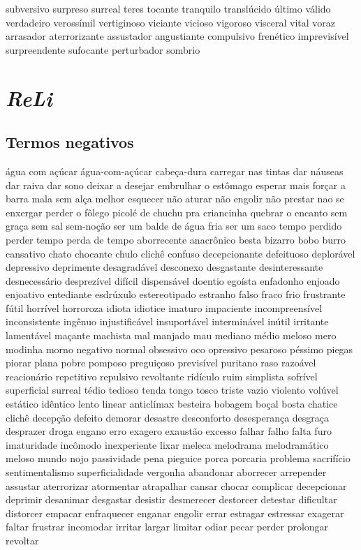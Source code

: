 \documentclass[ruledheader]{abnt_UFF}
\begin{document}
subversivo surpreso surreal teres tocante tranquilo transl\'{u}cido \'{u}ltimo v\'{a}lido verdadeiro veross\'{i}mil vertiginoso viciante vicioso vigoroso visceral vital voraz arrasador aterrorizante assustador angustiante compulsivo fren\'{e}tico imprevis\'{i}vel surpreendente sufocante perturbador sombrio

\section{\textit{ReLi}}
\subsection{Termos negativos}
\'{a}gua com a\c{c}\'{u}car \'{a}gua-com-a\c{c}\'{u}car cabe\c{c}a-dura carregar nas tintas dar n\'{a}useas dar raiva dar sono deixar a desejar embrulhar o est\^{o}mago esperar mais for\c{c}ar a barra mala sem al\c{c}a melhor esquecer n\~ao aturar n\~ao engolir n\~ao prestar nao se enxergar perder o f\^{o}lego picol\'{e} de chuchu pra criancinha quebrar o encanto sem gra\c{c}a sem sal sem-no\c{c}\~ao ser um balde de \'{a}gua fria ser um saco tempo perdido perder tempo perda de tempo aborrecente anacr\^{o}nico besta bizarro bobo burro cansativo chato chocante chulo clich\^{e} confuso decepcionante defeituoso deplor\'{a}vel depressivo deprimente desagrad\'{a}vel desconexo desgastante desinteressante desnecess\'{a}rio desprez\'{i}vel dif\'{i}cil dispens\'{a}vel doentio ego\'{i}sta enfadonho enjoado enjoativo entediante esdr\'{u}xulo estereotipado estranho falso fraco frio frustrante f\'{u}til horr\'{i}vel horroroza idiota idiotice imaturo impaciente incompreens\'{i}vel inconsistente ing\^{e}nuo injustific\'{a}vel insuport\'{a}vel intermin\'{a}vel in\'{u}til irritante lament\'{a}vel ma\c{c}ante machista mal manjado mau mediano m\'{e}dio meloso mero modinha morno negativo normal obsessivo oco opressivo pesaroso p\'{e}ssimo piegas piorar plana pobre pomposo pregui\c{c}oso previs\'{i}vel puritano raso razo\'{a}vel reacion\'{a}rio repetitivo repulsivo revoltante rid\'{i}culo ruim simplista sofr\'{i}vel superficial surreal t\'{e}dio tedioso tenda tongo tosco triste vazio violento vol\'{u}vel est\'{a}tico id\^{e}ntico lento linear anticl\'{i}max besteira bobagem bo\c{c}al bosta chatice clich\^{e} decep\c{c}\~ao defeito demorar desastre desconforto desesperan\c{c}a desgra\c{c}a desprazer droga engano erro exagero exaust\~ao excesso falhar falho falta furo imaturidade inc\^{o}modo inexperiente lixar meleca melodrama melodram\'{a}tico meloso mundo nojo passividade pena pieguice porca porcaria problema sacrif\'{i}cio sentimentalismo superficialidade vergonha abandonar aborrecer arrepender assustar aterrorizar atormentar atrapalhar cansar chocar complicar decepcionar deprimir desanimar desgastar desistir desmerecer destorcer detestar dificultar distorcer empacar enfraquecer enganar engolir errar estragar estressar exagerar faltar frustrar incomodar irritar largar limitar odiar pecar perder prolongar revoltar
\end{document}
